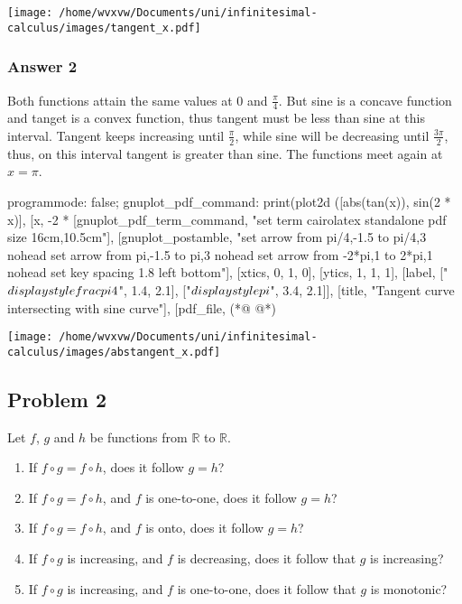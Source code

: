 \documentclass[a4paper]{article}
\begin{document}
\texttt{[image: /home/wvxvw/Documents/uni/infinitesimal-calculus/images/tangent\_x.pdf]}

\subsubsection{Answer 2}
\label{sec:orgheadline2}
Both functions attain the same values at 0 and \(\frac{\pi}{4}\).  But sine is
a concave function and tanget is a convex function, thus tangent must be less
than sine at this interval.  Tangent keeps increasing until \(\frac{\pi}{2}\),
while sine will be decreasing until \(\frac{3\pi}{2}\), thus, on this interval
tangent is greater than sine.  The functions meet again at \(x=\pi\).

\begin{maxima}
programmode: false;
gnuplot_pdf_command: %
print(plot2d ([abs(tan(x)), sin(2 * x)],
    [x, -2 * %
    [gnuplot_pdf_term_command, 
     "set term cairolatex standalone pdf size 16cm,10.5cm"],
    [gnuplot_postamble,
     "set arrow from pi/4,-1.5 to pi/4,3 nohead
      set arrow from pi,-1.5 to pi,3 nohead
      set arrow from -2*pi,1 to 2*pi,1 nohead
      set key spacing 1.8 left bottom"],
    [xtics, 0, 1, 0], [ytics, 1, 1, 1],
    [label, ["${\\displaystyle \\frac{\\pi}{4}}$", 1.4, 2.1],
            ["${\\displaystyle \\pi}$", 3.4, 2.1]],
    [title, "Tangent curve intersecting with sine curve"],
    [pdf_file, %
(*@\label{orgsrcblock2}
@*)
\end{maxima}

\texttt{[image: /home/wvxvw/Documents/uni/infinitesimal-calculus/images/abstangent\_x.pdf]}

\subsection{Problem 2}
\label{sec:orgheadline9}
Let \(f\), \(g\) and \(h\) be functions from \(\mathbb{R}\) to \(\mathbb{R}\).
\begin{enumerate}
\item If \(f \circ g = f \circ h\), does it follow \(g = h\)?
\item If \(f \circ g = f \circ h\), and \(f\) is one-to-one, does it follow \(g = h\)?
\item If \(f \circ g = f \circ h\), and \(f\) is onto, does it follow \(g = h\)?
\item If \(f \circ g\) is increasing, and \(f\) is decreasing, does it follow that
\(g\) is increasing?
\item If \(f \circ g\) is increasing, and \(f\) is one-to-one, does it follow that
\(g\) is monotonic?
\end{enumerate}
\end{document}
